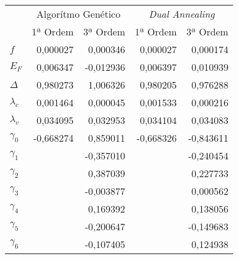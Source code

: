 \begin{tabular}{lrrrr}
\toprule
{} & \multicolumn{2}{c}{Algorítmo Genético} & \multicolumn{2}{c}{\textit{Dual Annealing}} \\
{} &           1ª Ordem &  3ª Ordem &                1ª Ordem &  3ª Ordem \\
\midrule
$f$         &           0,000027 &  0,000346 &                0,000027 &  0,000174 \\
$E_F$       &           0,006347 & -0,012936 &                0,006397 &  0,010939 \\
$\Delta$    &           0,980273 &  1,006326 &                0,980205 &  0,976288 \\
$\lambda_c$ &           0,001464 &  0,000045 &                0,001533 &  0,000216 \\
$\lambda_v$ &           0,034095 &  0,032953 &                0,034104 &  0,034083 \\
$\gamma_0$  &          -0,668274 &  0,859011 &               -0,668326 & -0,843611 \\
$\gamma_1$  &                    & -0,357010 &                         & -0,240454 \\
$\gamma_2$  &                    &  0,387039 &                         &  0,227733 \\
$\gamma_3$  &                    & -0,003877 &                         &  0,000562 \\
$\gamma_4$  &                    &  0,169392 &                         &  0,138056 \\
$\gamma_5$  &                    & -0,200647 &                         & -0,149683 \\
$\gamma_6$  &                    & -0,107405 &                         &  0,124938 \\
\bottomrule
\end{tabular}

